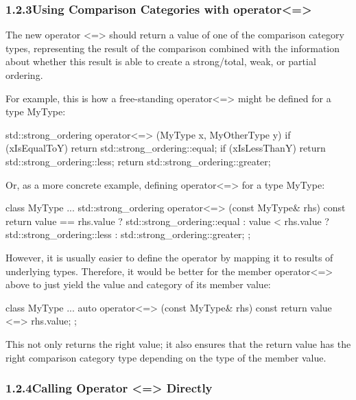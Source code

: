 \subsubsection*{ 1.2.3\hspace{0.2cm}Using Comparison Categories with operator<=>}

The new operator <=> should return a value of one of the comparison category types, representing the result of the comparison combined with the information about whether this result is able to create a strong/total, weak, or partial ordering.

For example, this is how a free-standing operator<=> might be defined for a type MyType:

\begin{cpp}
std::strong_ordering operator<=> (MyType x, MyOtherType y)
{
	if (xIsEqualToY) return std::strong_ordering::equal;
	if (xIsLessThanY) return std::strong_ordering::less;
	return std::strong_ordering::greater;
}
\end{cpp}

Or, as a more concrete example, defining operator<=> for a type MyType:

\begin{cpp}
class MyType {
	...
	std::strong_ordering operator<=> (const MyType& rhs) const {
		return value == rhs.value ? std::strong_ordering::equal :
			   value < rhs.value ? std::strong_ordering::less :
							       std::strong_ordering::greater;
	}
};
\end{cpp}

However, it is usually easier to define the operator by mapping it to results of underlying types. Therefore, it would be better for the member operator<=> above to just yield the value and category of its member value:

\begin{cpp}
class MyType {
	...
	auto operator<=> (const MyType& rhs) const {
		return value <=> rhs.value;
	}
};
\end{cpp}

This not only returns the right value; it also ensures that the return value has the right comparison category type depending on the type of the member value.

\subsubsection*{ 1.2.4\hspace{0.2cm}Calling Operator <=> Directly}

